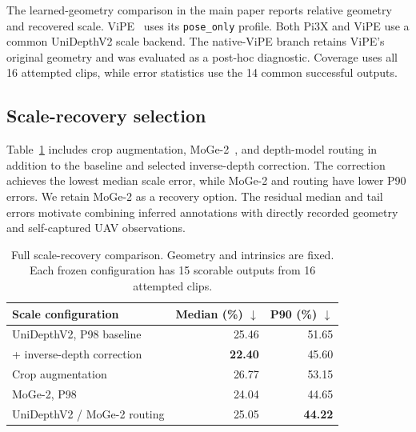 The learned-geometry comparison in the main paper reports relative geometry and recovered scale.
ViPE~\cite{huang2025vipevideoposeengine} uses its \texttt{pose\_only} profile.
Both Pi3X and ViPE use a common UniDepthV2 scale backend.
The native-ViPE branch retains ViPE's original geometry and was evaluated as a post-hoc diagnostic.
Coverage uses all 16 attempted clips, while error statistics use the 14 common successful outputs.

\subsection{Scale-recovery selection}

Table~\ref{tab:supp_scale} includes crop augmentation, MoGe-2~\cite{wang2025moge2accuratemonoculargeometry}, and depth-model routing in addition to the baseline and selected inverse-depth correction.
The correction achieves the lowest median scale error, while MoGe-2 and routing have lower P90 errors.
We retain MoGe-2 as a recovery option.
The residual median and tail errors motivate combining inferred annotations with directly recorded geometry and self-captured UAV observations.

\begin{table}[htbp]
    \centering
    \caption{Full scale-recovery comparison. Geometry and intrinsics are fixed. Each frozen configuration has 15 scorable outputs from 16 attempted clips.}
    \label{tab:supp_scale}
    \small
    \setlength{\tabcolsep}{3pt}
    \begin{tabular}{lrr}
        \toprule
        Scale configuration & Median (\%) $\downarrow$ & P90 (\%) $\downarrow$ \\
        \midrule
        UniDepthV2, P98 baseline & 25.46 & 51.65 \\
        + inverse-depth correction & \textbf{22.40} & 45.60 \\
        Crop augmentation & 26.77 & 53.15 \\
        MoGe-2, P98 & 24.04 & 44.65 \\
        UniDepthV2 / MoGe-2 routing & 25.05 & \textbf{44.22} \\
        \bottomrule
    \end{tabular}
\end{table}

